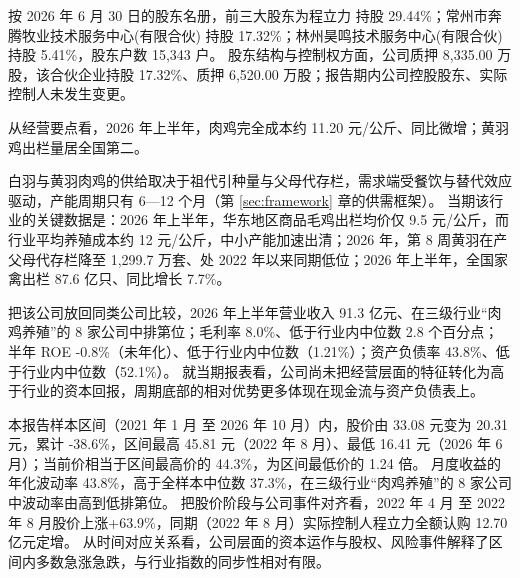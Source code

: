  按 2026 年 6 月 30 日的股东名册，前三大股东为程立力 持股 29.44\%；常州市奔腾牧业技术服务中心(有限合伙) 持股 17.32\%；林州昊鸣技术服务中心(有限合伙) 持股 5.41\%，股东户数 15,343 户。 股东结构与控制权方面，公司质押 8,335.00 万股，该合伙企业持股 17.32\%、质押 6,520.00 万股；报告期内公司控股股东、实际控制人未发生变更。

 从经营要点看，2026 年上半年，肉鸡完全成本约 11.20 元/公斤、同比微增；黄羽鸡出栏量居全国第二。

 白羽与黄羽肉鸡的供给取决于祖代引种量与父母代存栏，需求端受餐饮与替代效应驱动，产能周期只有 6---12 个月（第 \ref{sec:framework} 章的供需框架）。 当期该行业的关键数据是：2026 年上半年，华东地区商品毛鸡出栏均价仅 9.5 元/公斤，而行业平均养殖成本约 12 元/公斤，中小产能加速出清；2026 年，第 8 周黄羽在产父母代存栏降至 1,299.7 万套、处 2022 年以来同期低位；2026 年上半年，全国家禽出栏 87.6 亿只、同比增长 7.7\%。

 把该公司放回同类公司比较，2026 年上半年营业收入 91.3 亿元、在三级行业“肉鸡养殖”的 8 家公司中排第位；毛利率 8.0\%、低于行业内中位数 2.8 个百分点；半年 ROE -0.8\%（未年化）、低于行业内中位数（1.21\%）；资产负债率 43.8\%、低于行业内中位数（52.1\%）。 就当期报表看，公司尚未把经营层面的特征转化为高于行业的资本回报，周期底部的相对优势更多体现在现金流与资产负债表上。

 本报告样本区间（2021 年 1 月 至 2026 年 10 月）内，股价由 33.08 元变为 20.31 元，累计 -38.6\%，区间最高 45.81 元（2022 年 8 月）、最低 16.41 元（2026 年 6 月）；当前价相当于区间最高价的 44.3\%，为区间最低价的 1.24 倍。 月度收益的年化波动率 43.8\%，高于全样本中位数 37.3\%，在三级行业“肉鸡养殖”的 8 家公司中波动率由高到低排第位。 把股价阶段与公司事件对齐看，2022 年 4 月 至 2022 年 8 月股价上涨+63.9\%，同期（2022 年 8 月）实际控制人程立力全额认购 12.70 亿元定增。 从时间对应关系看，公司层面的资本运作与股权、风险事件解释了区间内多数急涨急跌，与行业指数的同步性相对有限。

